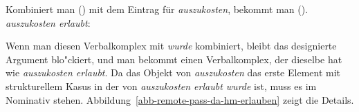 {\noindent
Kombiniert man () mit dem Eintrag für \emph{auszukosten}, bekommt man ().
\eas
\emph{auszukosten erlaubt}:\\
\zs

\noindent
Wenn man diesen Verbalkomplex mit \emph{wurde} kombiniert, bleibt das designierte Argument
blo"ckiert, und man bekommt einen Verbalkomplex, der dieselbe \compsl hat wie \emph{auszukosten erlaubt}.
Da das Objekt von \emph{auszukosten} das erste Element mit strukturellem Kasus in der \compsl von
{\em auszukosten erlaubt wurde} ist, muss es im Nominativ stehen.
%
Abbildung~\vref{abb-remote-pass-da-hm-erlauben} zeigt die Details.
\begin{figure}
\end{figure}}
